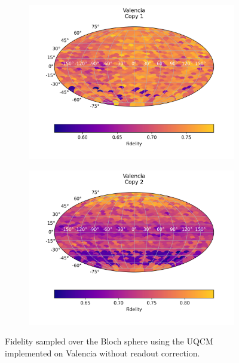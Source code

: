 \begin{figure}[H]
    \centering
    \begin{subfigure}{.5\textwidth}
      \centering
      \includegraphics[width=\textwidth]{Figures/UQCM/IBM/FullSphere/results_valencia_copy1.png}
    \end{subfigure}%
    \begin{subfigure}{.5\textwidth}
      \centering
      \includegraphics[width=\textwidth]{Figures/UQCM/IBM/FullSphere/results_valencia_copy2.png}
    \end{subfigure}
    \caption{Fidelity sampled over the Bloch sphere using the UQCM implemented on Valencia without readout correction.}
    \label{fig:uqcm_valencia_app}
\end{figure}



